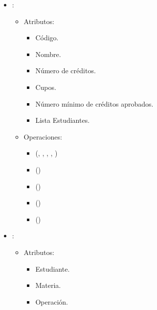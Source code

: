 \documentclass[11pt]{article}
\begin{document}
\begin{itemize}
\begin{itemize}
         \begin{itemize}
            \item {}(, , , )
         \end{itemize}
      \end{itemize}

      \item {}:
      \begin{itemize}
         \item Atributos:

         \begin{itemize}
            \item Código.
            \item Nombre.
            \item Número de créditos.
            \item Cupos.
            \item Número mínimo de créditos aprobados.
            \item Lista Estudiantes.
         \end{itemize}
      \end{itemize}
      
      \begin{itemize}
         \item Operaciones:
         
         \begin{itemize}
            \item {}(, , , , )
            \item {}()
            \item {}()
            \item {}()
            \item {}()
         \end{itemize}
      \end{itemize}


      \item {}:
      \begin{itemize}
         \item Atributos:

         \begin{itemize}
            \item Estudiante.
            \item Materia.
            \item Operación.
         \end{itemize}
      \end{itemize}


\end{itemize}
\end{document}
